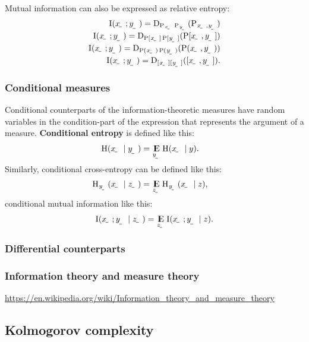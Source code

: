\documentclass{article}
\begin{document}
Mutual information can also be expressed as relative entropy:
\begin{align}
    \I(\rvar x; \rvar y) = \Dist_{\P_{\rvar x}\P_\rvar{y}}(\P_{\rvar x,\rvar y}) \\
    \I(\rvar x; \rvar y) = \Dist_{\P[\rvar x]\P[\rvar y]}(\P[\rvar x,\rvar y]) \\
    \I(\rvar x; \rvar y) = \Dist_{\P(\rvar x)\P(\rvar y)}(\P(\rvar x,\rvar y)) \\
    \I(\rvar x; \rvar y) = \Dist_{[\rvar x][\rvar y]}([\rvar x,\rvar y]) \text.
\end{align}

\subsubsection{Conditional measures}

Conditional counterparts of the information-theoretic measures have random variables in the condition-part of the expression that represents the argument of a measure. \textbf{Conditional entropy} is defined like this:
\begin{align}
    \H(\rvar x\mid\rvar y) &= \E_{\rvar y}\H(\rvar x\mid y) \text.
\end{align}
Similarly, conditional cross-entropy can be defined like this:
\begin{align}
    \H_\rvar{y}(\rvar x\mid\rvar z) &= \E_\rvar{z}\H_\rvar{y}(\rvar x\mid z) \text,
\end{align}
conditional mutual information like this:
\begin{align}
    \I(\rvar x; \rvar y\mid \rvar z) = \E_\rvar{z}\I\del{\rvar x; \rvar y \mid z} \text.
\end{align}

\subsubsection{Differential counterparts}

\subsubsection{Information theory and measure theory}

\url{https://en.wikipedia.org/wiki/Information_theory_and_measure_theory}

\subsection{Kolmogorov complexity}
\end{document}
